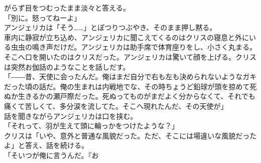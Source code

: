 \documentclass[b5j,10pt,openany]{jsbook}
\begin{document}
がらず目をつむったまま淡々と答える。\\「別に。怒ってねーよ」\\アンジェリカは「そう\ldots{}\ldots{}」とぽつりつぶやき、そのまま押し黙る。\\車内に静寂が立ち込め、アンジェリカに聞こえてくるのはクリスの寝息と外にいる虫虫の鳴き声だけだ。アンジェリカは助手席で体育座りをし、小さく丸まる。\\そこへ口を開いたのはクリスだった。アンジェリカは驚いて顔を上げる。クリスは突然お伽話のようなことを話しだす。\\「――昔、天使に会ったんだ。俺はまだ自分で右も左も決められないようなガキだった頃の話だ。俺の生まれは内戦地でな、その時ちょうど鉛球が頭を掠めて死ぬか生きるかの瀬戸際だった。死ぬってものがまだよく分からなくて、それでも痛くて苦しくて、多分涙を流してた。そこへ現れたんだ、その天使が」\\話を聞きながらアンジェリカは口を挟む。\\「それって、羽が生えて頭に輪っかをつけたような？」\\クリスは「いや、意外と普通な風貌だった。ただ、そこには場違いな風貌だったよ」と答え、話を続ける。\\「そいつが俺に言うんだ。『お
\end{document}
